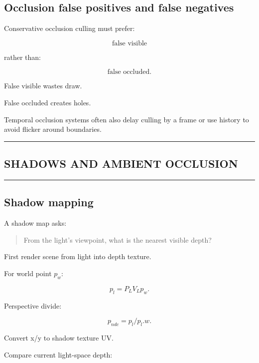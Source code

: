 \subsection{Occlusion false positives and false negatives}\label{04-visual-computing-ii-ch040-occlusion-false-positives-and-false-negatives}

Conservative occlusion culling must prefer:

\[
\boxed{
\text{false visible}
}
\]

rather than:

\[
\boxed{
\text{false occluded}.
}
\]

False visible wastes draw.

False occluded creates holes.

Temporal occlusion systems often also delay culling by a frame or use history to avoid flicker around boundaries.

\begin{center}\rule{0.5\linewidth}{0.5pt}\end{center}

\subsection{SHADOWS AND AMBIENT OCCLUSION}\label{04-visual-computing-ii-ch040-shadows-and-ambient-occlusion}

\begin{center}\rule{0.5\linewidth}{0.5pt}\end{center}

\subsection{Shadow mapping}\label{04-visual-computing-ii-ch040-shadow-mapping}

A shadow map asks:

\begin{quote}
From the light's viewpoint, what is the nearest visible depth?
\end{quote}

First render scene from light into depth texture.

For world point \(p_w\):

\[
p_l=
P_LV_Lp_w.
\]

Perspective divide:

\[
p_{ndc}
=
p_l/p_l.w.
\]

Convert x/y to shadow texture UV.

Compare current light-space depth:

